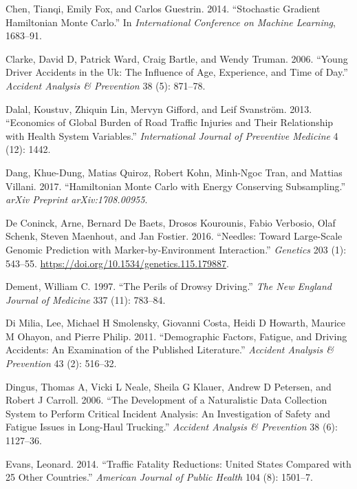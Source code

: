 \documentclass[12pt]{book}
\numberwithin{equation}{chapter}
\begin{document}
\leavevmode\hypertarget{ref-chen2014stochastic}{}%
Chen, Tianqi, Emily Fox, and Carlos Guestrin. 2014. ``Stochastic Gradient Hamiltonian Monte Carlo.'' In \emph{International Conference on Machine Learning}, 1683--91.

\leavevmode\hypertarget{ref-clarke2006young}{}%
Clarke, David D, Patrick Ward, Craig Bartle, and Wendy Truman. 2006. ``Young Driver Accidents in the Uk: The Influence of Age, Experience, and Time of Day.'' \emph{Accident Analysis \& Prevention} 38 (5): 871--78.

\leavevmode\hypertarget{ref-dalal2013economics}{}%
Dalal, Koustuv, Zhiquin Lin, Mervyn Gifford, and Leif Svanström. 2013. ``Economics of Global Burden of Road Traffic Injuries and Their Relationship with Health System Variables.'' \emph{International Journal of Preventive Medicine} 4 (12): 1442.

\leavevmode\hypertarget{ref-dang2017hamiltonian}{}%
Dang, Khue-Dung, Matias Quiroz, Robert Kohn, Minh-Ngoc Tran, and Mattias Villani. 2017. ``Hamiltonian Monte Carlo with Energy Conserving Subsampling.'' \emph{arXiv Preprint arXiv:1708.00955}.

\leavevmode\hypertarget{ref-Coninck2016}{}%
De Coninck, Arne, Bernard De Baets, Drosos Kourounis, Fabio Verbosio, Olaf Schenk, Steven Maenhout, and Jan Fostier. 2016. ``Needles: Toward Large-Scale Genomic Prediction with Marker-by-Environment Interaction.'' \emph{Genetics} 203 (1): 543--55. \url{https://doi.org/10.1534/genetics.115.179887}.

\leavevmode\hypertarget{ref-dement1997perils}{}%
Dement, William C. 1997. ``The Perils of Drowsy Driving.'' \emph{The New England Journal of Medicine} 337 (11): 783--84.

\leavevmode\hypertarget{ref-di2011demographic}{}%
Di Milia, Lee, Michael H Smolensky, Giovanni Costa, Heidi D Howarth, Maurice M Ohayon, and Pierre Philip. 2011. ``Demographic Factors, Fatigue, and Driving Accidents: An Examination of the Published Literature.'' \emph{Accident Analysis \& Prevention} 43 (2): 516--32.

\leavevmode\hypertarget{ref-dingus2006development}{}%
Dingus, Thomas A, Vicki L Neale, Sheila G Klauer, Andrew D Petersen, and Robert J Carroll. 2006. ``The Development of a Naturalistic Data Collection System to Perform Critical Incident Analysis: An Investigation of Safety and Fatigue Issues in Long-Haul Trucking.'' \emph{Accident Analysis \& Prevention} 38 (6): 1127--36.

\leavevmode\hypertarget{ref-evans2014traffic}{}%
Evans, Leonard. 2014. ``Traffic Fatality Reductions: United States Compared with 25 Other Countries.'' \emph{American Journal of Public Health} 104 (8): 1501--7.
\end{document}
